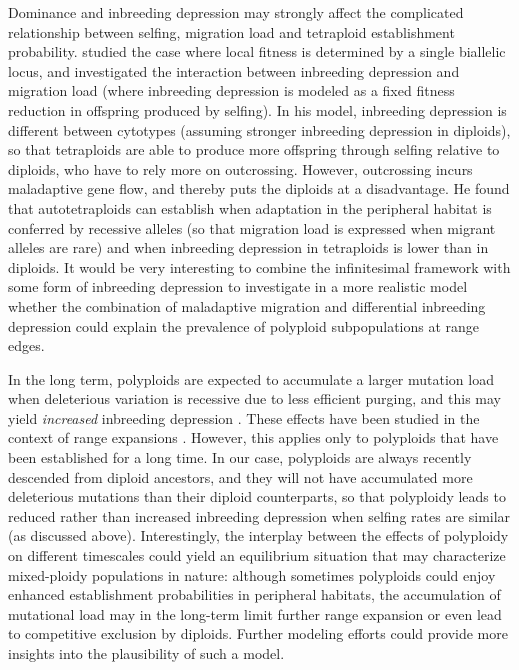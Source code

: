 \documentclass[12pt,a4paper]{article}
\begin{document}
Dominance and inbreeding depression may strongly affect the complicated
relationship between selfing, migration load and tetraploid establishment
probability.
\cite{griswold2021} studied the case where local fitness is determined by a
single biallelic locus, and investigated the interaction between inbreeding
depression and migration load (where inbreeding depression is modeled as a
fixed fitness reduction in offspring produced by selfing).
In his model, inbreeding depression is different between cytotypes (assuming
stronger inbreeding depression in diploids), so that tetraploids are able to
produce more offspring through selfing relative to diploids, who have to rely
more on outcrossing.
However, outcrossing incurs maladaptive gene flow, and thereby puts the
diploids at a disadvantage. 
He found that autotetraploids can establish when adaptation in the
peripheral habitat is conferred by recessive alleles (so that migration load is
expressed when migrant alleles are rare) and when inbreeding depression in
tetraploids is lower than in diploids.
It would be very interesting to combine the infinitesimal framework with some
form of inbreeding depression to investigate in a more realistic model whether
the combination of maladaptive migration and differential inbreeding depression
could explain the prevalence of polyploid subpopulations at range edges.

In the long term, polyploids are expected to accumulate a larger
mutation load when deleterious variation is recessive due to less efficient
purging, and this may yield \textit{increased} inbreeding depression
\citep{vlcek2025biorxiv}.
These effects have been studied in the context of range expansions
\citep{booker2024}.
However, this applies only to polyploids that have been established for a long
time.
In our case, polyploids are always recently descended from diploid ancestors,
and they will not have accumulated more deleterious mutations than their
diploid counterparts, so that polyploidy leads to reduced rather than increased
inbreeding depression when selfing rates are similar (as discussed above).
Interestingly, the interplay between the effects of polyploidy on different
timescales could yield an equilibrium situation that may characterize
mixed-ploidy populations in nature: although sometimes polyploids could enjoy
enhanced establishment probabilities in peripheral habitats, the accumulation
of mutational load may in the long-term limit further range expansion or
even lead to competitive exclusion by diploids.
Further modeling efforts could provide more insights into the plausibility of
such a model.


%



\end{document}
